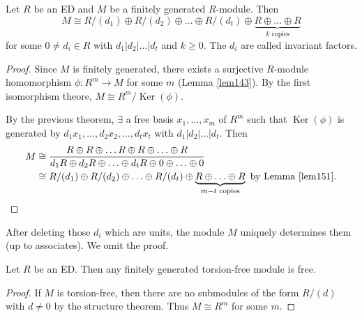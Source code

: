 \documentclass[egregdoesnotlikesansseriftitles,a4paper]{scrartcl}
\begin{document}
\begin{theorem}
        Let $R$ be an ED and $M$ be a finitely generated $R$-module. Then \[
        M \cong R/(d_1) \oplus R/(d_2) \oplus \ldots  \oplus R/(d_t) \oplus \underbrace{R \oplus \ldots \oplus R}_{k \text{ copies} } 
        \] for some $0 \neq d_{i}\in R$ with $d_1 | d_2 | \ldots| d_{t}$ and $k \geq 0$. The $d_{i}$ are called invariant factors.
        \begin{proof}
                Since $M$ is finitely generated, there exists a surjective $R$-module homomorphism $\phi: R^{m}\rightarrow M$ for some $m$ (Lemma \ref{lem143}). By the first isomorphism theore, $M \cong R^{m}/ \operatorname{Ker}(\phi)$.

                By the previous theorem, $\exists $ a free basis $x_1 , \ldots, x_{m}$ of $R^{m}$ such that $\operatorname{Ker}(\phi)$ is generated by $d_1 x_1 , \ldots, d_2 x_2 , \ldots, d_{t}x_{t}$ with $d_1 | d_2 | \ldots| d_{t}$. Then 
                \begin{align*}
                       M &\cong \frac{R \oplus R \oplus \ldots R \oplus R \oplus \ldots \oplus R}{d_1 R \oplus d_2 R \oplus \ldots \oplus d_{t}R \oplus 0 \oplus \ldots \oplus 0}\\
                       & \cong R/(d_1) \oplus R/(d_2) \oplus \ldots  \oplus R/(d_t) \oplus \underbrace{R \oplus \ldots \oplus R}_{m-t \text{ copies}} \text{ by Lemma }\ref{lem151}.
                \end{align*}
        \end{proof}
        \begin{remark}
                After deleting those $d_{i}$ which are units, the module $M$ uniquely determines them (up to associates). We omit the proof. 
        \end{remark}
\end{theorem}
\begin{corollary}
        Let $R$ be an ED. Then any finitely generated torsion-free module is free.
        \begin{proof}
                If $M$ is torsion-free, then there are no submodules of the form $R/ (d)$ with $d \neq 0 $ by the structure theorem. Thus $M \cong R^{m}$ for some $m$.
        \end{proof}
\end{corollary}
\end{document}
